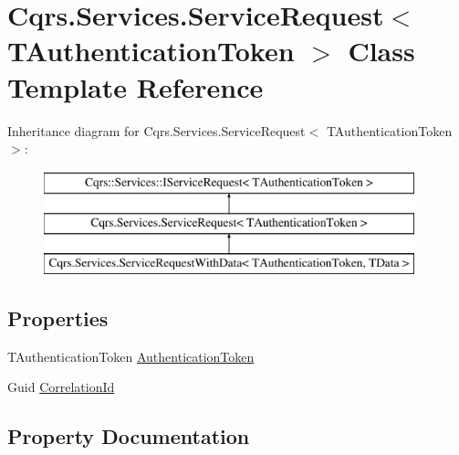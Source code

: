 \hypertarget{classCqrs_1_1Services_1_1ServiceRequest}{}\section{Cqrs.\+Services.\+Service\+Request$<$ T\+Authentication\+Token $>$ Class Template Reference}
\label{classCqrs_1_1Services_1_1ServiceRequest}
Inheritance diagram for Cqrs.\+Services.\+Service\+Request$<$ T\+Authentication\+Token $>$\+:\begin{figure}[H]
\begin{center}
\leavevmode
\includegraphics[height=3.000000cm]{classCqrs_1_1Services_1_1ServiceRequest}
\end{center}
\end{figure}
\subsection*{Properties}
\begin{DoxyCompactItemize}
\item 
T\+Authentication\+Token \hyperlink{classCqrs_1_1Services_1_1ServiceRequest_ac1a9faff43be83d010b5b59a849c4c4b}{Authentication\+Token}
\item 
Guid \hyperlink{classCqrs_1_1Services_1_1ServiceRequest_abbf7a905744ac65ab59edf4f550cad61}{Correlation\+Id}
\end{DoxyCompactItemize}


\subsection{Property Documentation}
\mbox{\label{classCqrs_1_1Services_1_1ServiceRequest_ac1a9faff43be83d010b5b59a849c4c4b}} 
